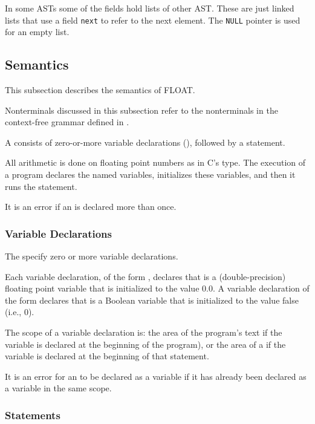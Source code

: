 \documentclass[11pt]{article}
\begin{document}
In some ASTs some of the fields hold lists of other AST.
These are just linked lists that use a field \texttt{next} to refer to
the next element. The \texttt{NULL} pointer is used for an empty list.

\clearpage

\subsection{Semantics}

This subsection describes the semantics of FLOAT.

Nonterminals discussed in this subsection refer to the nonterminals in
the context-free grammar defined in .

A  consists of zero-or-more variable declarations
(), followed by a statement.

All arithmetic is done on floating point numbers as in C's
 type.
The execution of a program declares the named variables,
initializes these variables, and then it runs the statement.

It is an error if an  is declared more than once.

\subsubsection{Variable Declarations}

The  specify zero or more variable declarations.

Each variable declaration, of the form  ,
declares that  is a (double-precision) floating point variable
that is initialized to the value 0.0.
A variable declaration of the form  
declares that  is a Boolean variable that is
initialized to the value false (i.e., 0).

The scope of a variable declaration is:
the area of the program's text if the variable is declared at the
beginning of the program),
or the area of a  if the variable is declared at
the beginning of that statement.

It is an error for an  to be declared as a variable if
it has already been declared as a variable in the same scope.

\subsubsection{Statements}
\end{document}
